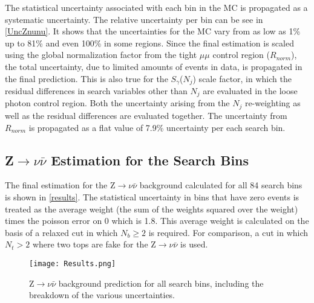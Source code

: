 The statistical uncertainty associated with each bin in the MC is propagated as a systematic uncertainty. The relative uncertainty per bin can be see in \autoref{UncZnunu}. It shows that the uncertainties for the MC vary from as low as 1\% up to 81\% and even 100\% in some regions. Since the final estimation is scaled using the global normalization factor from the tight $\mu\mu$ control region ($R_{norm}$), the total uncertainty, due to limited amounts of events in data, is propagated in the final prediction. This is also true for the $S_\gamma$($N_j$) scale factor, in which the residual differences in search variables other than $N_j$ are evaluated in the loose photon control region. Both the uncertainty arising from the $N_j$ re-weighting as well as the residual differences are evaluated together. The uncertainty from $R_{norm}$ is propagated as a flat value of 7.9\% uncertainty per each search bin.

\subsection{Z$\rightarrow\nu\bar{\nu}$ Estimation for the Search Bins}

The final estimation for the Z$\rightarrow\nu\bar{\nu}$ background calculated for all 84 search bins is shown in \autoref{results}. The statistical uncertainty in bins that have zero events is treated as the average weight (the sum of the weights squared over the weight) times the poisson error on 0 which is 1.8. This average weight is calculated on the basis of a relaxed cut in which $N_b \geq 2$ is required. For comparison, a cut in which $N_t > 2$ where two tops are fake for the Z$\rightarrow\nu\bar{\nu}$ is used.

\begin{figure}[H]
\begin{center}
\texttt{[image: Results.png]}
\end{center}
\vspace{-1em}
\caption{Z$\rightarrow\nu\bar{\nu}$ background prediction for all search bins, including the breakdown of the various uncertainties.}
\label{results}
\end{figure}


